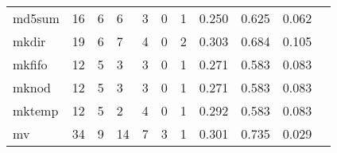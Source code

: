 \begin{longtable}{lp{1.20cm}p{1.20cm}p{1.20cm}p{1.20cm}p{1.20cm}p{1.20cm}p{1.20cm}p{1.20cm}p{1.20cm}p{1.20cm}}
md5sum    &                                    16 &                                                  6 &                                                  6 &                                                  3 &                                                  0 &                                                  1 &                                         0.250 &                                              0.625 &                                              0.062 \\
mkdir     &                                    19 &                                                  6 &                                                  7 &                                                  4 &                                                  0 &                                                  2 &                                         0.303 &                                              0.684 &                                              0.105 \\
mkfifo    &                                    12 &                                                  5 &                                                  3 &                                                  3 &                                                  0 &                                                  1 &                                         0.271 &                                              0.583 &                                              0.083 \\
mknod     &                                    12 &                                                  5 &                                                  3 &                                                  3 &                                                  0 &                                                  1 &                                         0.271 &                                              0.583 &                                              0.083 \\
mktemp    &                                    12 &                                                  5 &                                                  2 &                                                  4 &                                                  0 &                                                  1 &                                         0.292 &                                              0.583 &                                              0.083 \\
mv        &                                    34 &                                                  9 &                                                 14 &                                                  7 &                                                  3 &                                                  1 &                                         0.301 &                                              0.735 &                                              0.029 \\

\end{longtable}
